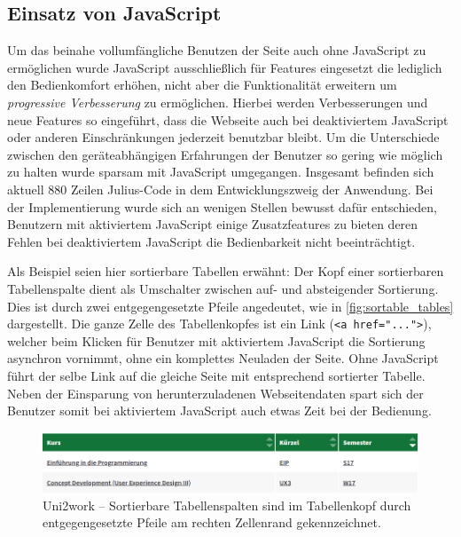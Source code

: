 \documentclass[11pt,a4paper,twoside,ngerman]{article}
\begin{document}
\subsection{Einsatz von JavaScript} \label{sec:einsatz-js}
Um das beinahe vollumfängliche Benutzen der Seite auch ohne JavaScript zu ermöglichen wurde JavaScript ausschließlich für Features eingesetzt die lediglich den Bedienkomfort erhöhen, nicht aber die Funktionalität erweitern um \textit{progressive Verbesserung} zu ermöglichen. Hierbei werden Verbesserungen und neue Features so eingeführt, dass die Webseite auch bei deaktiviertem JavaScript oder anderen Einschränkungen jederzeit benutzbar bleibt. Um die Unterschiede zwischen den geräteabhängigen Erfahrungen der Benutzer so gering wie möglich zu halten wurde sparsam mit JavaScript umgegangen. Insgesamt befinden sich aktuell 880 Zeilen Julius-Code in dem Entwicklungszweig der Anwendung.
Bei der Implementierung wurde sich an wenigen Stellen bewusst dafür entschieden, Benutzern mit aktiviertem JavaScript einige Zusatzfeatures zu bieten deren Fehlen bei deaktiviertem JavaScript die Bedienbarkeit nicht beeinträchtigt.

Als Beispiel seien hier sortierbare Tabellen erwähnt: Der Kopf einer sortierbaren Tabellenspalte dient als Umschalter zwischen auf- und absteigender Sortierung. Dies ist durch zwei entgegengesetzte Pfeile angedeutet, wie in \autoref{fig:sortable_tables} dargestellt. Die ganze Zelle des Tabellenkopfes ist ein Link (\lstinline{<a href="...">}), welcher beim Klicken für Benutzer mit aktiviertem JavaScript die Sortierung asynchron vornimmt, ohne ein komplettes Neuladen der Seite. Ohne JavaScript führt der selbe Link auf die gleiche Seite mit entsprechend sortierter Tabelle. Neben der Einsparung von herunterzuladenen Webseitendaten spart sich der Benutzer somit bei aktiviertem JavaScript auch etwas Zeit bei der Bedienung.

\begin{figure}[h]
    \centering
    \includegraphics[width=\textwidth]{images/sortable_tables.png}
    \caption{Uni2work -- Sortierbare Tabellenspalten sind im Tabellenkopf durch entgegengesetzte Pfeile am rechten Zellenrand gekennzeichnet.}
    \label{fig:sortable_tables}
\end{figure}
\end{document}
